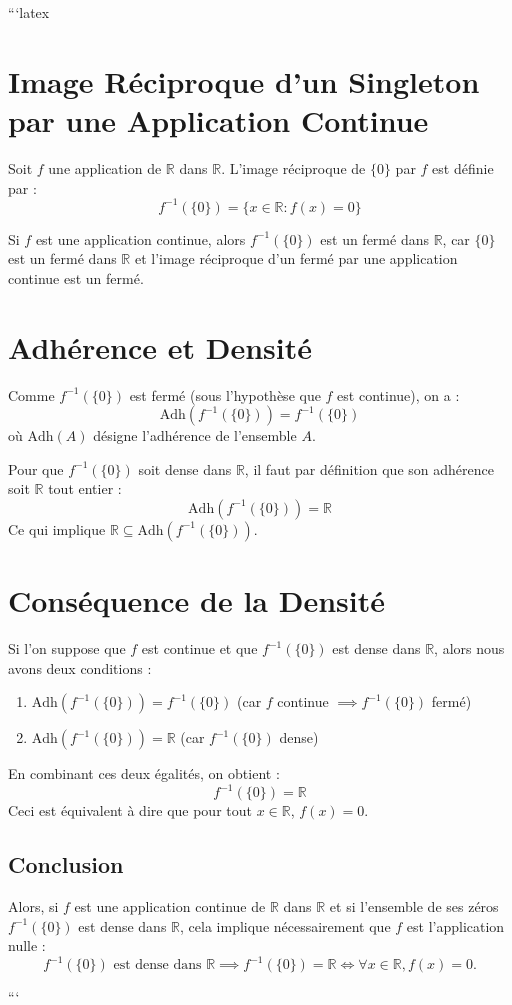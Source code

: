 ```latex

\sloppy

\section{Image Réciproque d'un Singleton par une Application Continue}

Soit $f$ une application de $\mathbb{R}$ dans $\mathbb{R}$. L'image réciproque de $\{0\}$ par $f$ est définie par :
\[
f^{-1}(\{0\}) = \{ x \in \mathbb{R} : f(x) = 0 \}
\]

Si $f$ est une application continue, alors $f^{-1}(\{0\})$ est un fermé dans $\mathbb{R}$, car $\{0\}$ est un fermé dans $\mathbb{R}$ et l'image réciproque d'un fermé par une application continue est un fermé.

\section{Adhérence et Densité}

Comme $f^{-1}(\{0\})$ est fermé (sous l'hypothèse que $f$ est continue), on a :
\[
\text{Adh}(f^{-1}(\{0\})) = f^{-1}(\{0\})
\]
où $\text{Adh}(A)$ désigne l'adhérence de l'ensemble $A$.

Pour que $f^{-1}(\{0\})$ soit dense dans $\mathbb{R}$, il faut par définition que son adhérence soit $\mathbb{R}$ tout entier :
\[
\text{Adh}(f^{-1}(\{0\})) = \mathbb{R}
\]
Ce qui implique $\mathbb{R} \subseteq \text{Adh}(f^{-1}(\{0\}))$.

\section{Conséquence de la Densité}

Si l'on suppose que $f$ est continue et que $f^{-1}(\{0\})$ est dense dans $\mathbb{R}$, alors nous avons deux conditions :
\begin{enumerate}
    \item $\text{Adh}(f^{-1}(\{0\})) = f^{-1}(\{0\})$ (car $f$ continue $\implies f^{-1}(\{0\})$ fermé)
    \item $\text{Adh}(f^{-1}(\{0\})) = \mathbb{R}$ (car $f^{-1}(\{0\})$ dense)
\end{enumerate}
En combinant ces deux égalités, on obtient :
\[
f^{-1}(\{0\}) = \mathbb{R}
\]
Ceci est équivalent à dire que pour tout $x \in \mathbb{R}$, $f(x) = 0$.

\subsection{Conclusion}
Alors, si $f$ est une application continue de $\mathbb{R}$ dans $\mathbb{R}$ et si l'ensemble de ses zéros $f^{-1}(\{0\})$ est dense dans $\mathbb{R}$, cela implique nécessairement que $f$ est l'application nulle :
\[
f^{-1}(\{0\}) \text{ est dense dans } \mathbb{R} \implies f^{-1}(\{0\}) = \mathbb{R} \iff \forall x \in \mathbb{R}, f(x) = 0.
\]


```